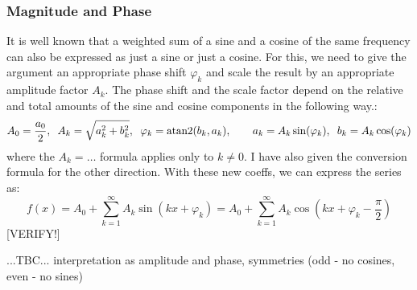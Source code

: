 

\subsubsection{Magnitude and Phase}
It is well known that a weighted sum of a sine and a cosine of the same frequency can also be expressed as just a sine or just a cosine. For this, we need to give the argument an appropriate phase shift $\varphi_k$ and scale the result by an appropriate amplitude factor $A_k$. The phase shift and the scale factor depend on the relative and total amounts of the sine and cosine components in the following way.:
\begin{equation}
 A_0 = \frac{a_0}{2},           \;\;
 A_k = \sqrt{a_k^2 + b_k^2},    \;\;
 \varphi_k = \atan2(b_k, a_k),  \qquad
 a_k = A_k \sin(\varphi_k),     \;\;
 b_k = A_k \cos(\varphi_k)   
\end{equation}
where the $A_k = \ldots$ formula applies only to $k \neq 0$. I have also given the conversion formula for the other direction. With these new coeffs, we can express the series as:
\begin{equation}
f(x) = A_0 + \sum_{k=1}^\infty A_k \sin(k x +\varphi_k) 
     = A_0 + \sum_{k=1}^\infty A_k \cos(k x +\varphi_k - \frac{\pi}{2})
\end{equation}
[VERIFY!] 
\newline



\medskip
...TBC... interpretation as amplitude and phase, symmetries (odd - no cosines, even - no sines)

